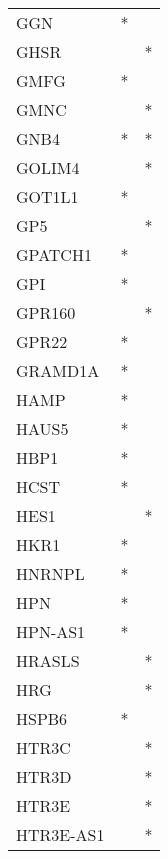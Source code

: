 \begin{longtable}{lcc}
GGN              &              * &            \\
GHSR             &                &          * \\
GMFG             &              * &            \\
GMNC             &                &          * \\
GNB4             &              * &          * \\
GOLIM4           &                &          * \\
GOT1L1           &              * &            \\
GP5              &                &          * \\
GPATCH1          &              * &            \\
GPI              &              * &            \\
GPR160           &                &          * \\
GPR22            &              * &            \\
GRAMD1A          &              * &            \\
HAMP             &              * &            \\
HAUS5            &              * &            \\
HBP1             &              * &            \\
HCST             &              * &            \\
HES1             &                &          * \\
HKR1             &              * &            \\
HNRNPL           &              * &            \\
HPN              &              * &            \\
HPN-AS1          &              * &            \\
HRASLS           &                &          * \\
HRG              &                &          * \\
HSPB6            &              * &            \\
HTR3C            &                &          * \\
HTR3D            &                &          * \\
HTR3E            &                &          * \\
HTR3E-AS1        &                &          * \\

\end{longtable}
